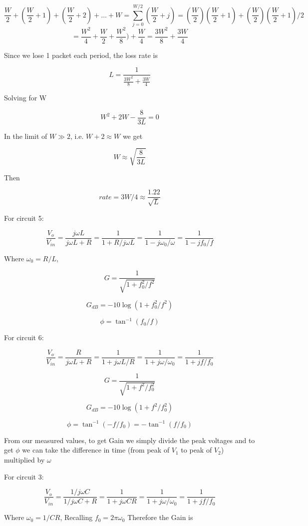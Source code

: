 \documentclass{article}
\begin{document}
$$\frac{W}{2} + (\frac{W}{2} + 1) +  (\frac{W}{2} + 2) + ... + W = \sum_{j=0}^{W/2}( \frac{W}{2} + j) =  (\frac{W}{2}) (\frac{W}{2}+1) +  (\frac{W}{2}) (\frac{W}{2} + 1)/2  $$
$$ =  \frac{W^2}{4} + \frac{W}{2}+ \frac{W^2}{8}) +\frac{W}{4} =  \frac{3W^2}{8} + \frac{3W}{4}$$ 

Since we lose 1 packet each period, the loss rate is

$$ L = \frac{1}{\frac{3W^2}{8} + \frac{3W}{4}} $$

Solving for W 

$$ W^2 + 2W - \frac{8}{3L} = 0 $$

In the limit of $W \gg 2$, i.e. $W + 2 \approx W$ we get 

$$ W \approx \sqrt{\frac{8}{3L}} $$

Then 

$$rate = 3W/4 \approx \frac{1.22}{\sqrt{L}}$$


For circuit 5: 

$$\frac{V_o}{V_{in}} = \frac{j \omega L}{j \omega L + R} = \frac{1}{1 + R/j \omega L} =  \frac{1}{1 - j \omega_0/ \omega} =\frac{1}{1 - j f_0/ f}  $$

Where $ \omega_0 = R/L$, 

$$G = \frac{1}{\sqrt{1 + f_0^2/f^2}}$$

$$G_{dB} = -10 \log (1 + f_0^2/f^2)$$

$$\phi = \tan ^{-1} (f_0/f) $$

For circuit 6: 


$$\frac{V_o}{V_{in}} = \frac{R}{j \omega L + R} = \frac{1}{1 + j \omega L/R} =  \frac{1}{1 + j \omega/ \omega_0} =\frac{1}{1 +j f/ f_0}  $$

$$G = \frac{1}{\sqrt{1 + f^2/f^2_0}}$$

$$G_{dB} = -10 \log (1 + f^2/f^2_0)$$

$$\phi = \tan ^{-1} (-f/f_0) = - \tan ^{-1} (f/f_0) $$


From our measured values, to get Gain we simply divide the peak voltages and to get $\phi$ we can take the difference in time (from peak of $V_1$ to peak of $V_2$) multiplied by $\omega$




For circuit 3:

$$\frac{V_o}{V_{in}} = \frac{1/j \omega C}{1/j \omega C + R} = \frac{1}{1 + j \omega C R} =  \frac{1}{1 + j \omega/ \omega_0} =\frac{1}{1 + j f/ f_0}  $$

Where $ \omega_0 = 1/CR$, Recalling $f_0 = 2\pi \omega_0  $ Therefore the Gain is
\end{document}
